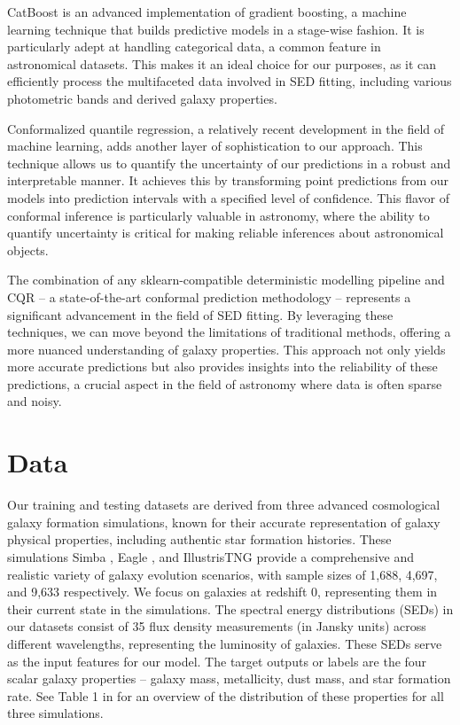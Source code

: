 \documentclass[letterpaper]{article}
\begin{document}
CatBoost is an advanced implementation of gradient boosting, a machine learning technique that builds predictive models in a stage-wise fashion. It is particularly adept at handling categorical data, a common feature in astronomical datasets. This makes it an ideal choice for our purposes, as it can efficiently process the multifaceted data involved in SED fitting, including various photometric bands and derived galaxy properties.

Conformalized quantile regression, a relatively recent development in the field of machine learning, adds another layer of sophistication to our approach. This technique allows us to quantify the uncertainty of our predictions in a robust and interpretable manner. It achieves this by transforming point predictions from our models into prediction intervals with a specified level of confidence. This flavor of conformal inference \cite{shafer2008tutorial_conformal} is particularly valuable in astronomy, where the ability to quantify uncertainty is critical for making reliable inferences about astronomical objects.

The combination of any sklearn-compatible deterministic modelling pipeline and CQR -- a state-of-the-art conformal prediction methodology -- represents a significant advancement in the field of SED fitting. By leveraging these techniques, we can move beyond the limitations of traditional methods, offering a more nuanced understanding of galaxy properties. This approach not only yields more accurate predictions but also provides insights into the reliability of these predictions, a crucial aspect in the field of astronomy where data is often sparse and noisy.

\section{Data}
Our training and testing datasets are derived from three advanced cosmological galaxy formation simulations, known for their accurate representation of galaxy physical properties, including authentic star formation histories. These simulations  {\sc Simba} \cite{dave_simba}, {\sc Eagle} \cite{schaye_2015_eagle,schaller_2015_eagle,mcalpine_2016_eagle_cat}, and {\sc IllustrisTNG} \cite{vogelsberger2014introducingillustris}  provide a comprehensive and realistic variety of galaxy evolution scenarios, with sample sizes of 1,688, 4,697, and 9,633 respectively. We focus on galaxies at redshift 0, representing them in their current state in the simulations. The spectral energy distributions (SEDs) in our datasets consist of 35 flux density measurements (in Jansky units) across different wavelengths, representing the luminosity of galaxies. These SEDs serve as the input features for our model. The target outputs or labels are the four scalar galaxy properties -- galaxy mass, metallicity, dust mass, and star formation rate. See Table 1 in \citet{Gilda21} for an overview of the distribution of these properties for all three simulations.
\end{document}
